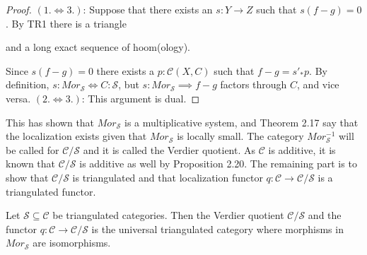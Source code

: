     \begin{proof}
        $(1.\iff 3.)$:
        Suppose that there exists an $s:Y\rightarrow Z$ such that $s(f-g)=0$. By TR1 there is a triangle  and a long exact sequence of hoom(ology).
        \begin{center}
        \end{center}
        Since $s(f-g)=0$ there exists a $p:\mathcal{C}(X,C)$ such that $f-g = s'_*p$. By definition, $s:Mor_\mathcal{S}\iff C:\mathcal{S}$, but $s:Mor_\mathcal{S}\implies f-g$ factors through $C$, and vice versa.
        $(2.\iff 3.)$:
        This argument is dual.
    \end{proof}

    This has shown that $Mor_\mathcal{S}$ is a multiplicative system, and Theorem 2.17 say that the localization exists given that $Mor_\mathcal{S}$ is locally small. The category $Mor_\mathcal{S}^{-1}$ will be called for $\mathcal{C}/\mathcal{S}$ and it is called the Verdier quotient. As $\mathcal{C}$ is additive, it is known that $\mathcal{C}/\mathcal{S}$ is additive as well by Proposition 2.20. The remaining part is to show that $\mathcal{C}/\mathcal{S}$ is triangulated and that localization functor $q:\mathcal{C}\rightarrow \mathcal{C}/\mathcal{S}$ is a triangulated functor.

    \begin{theorem}
        Let $\mathcal{S}\subseteq\mathcal{C}$ be triangulated categories. Then the Verdier quotient $\mathcal{C}/\mathcal{S}$ and the functor $q:\mathcal{C}\rightarrow\mathcal{C}/\mathcal{S}$ is the universal triangulated category where morphisms in $Mor_\mathcal{S}$ are isomorphisms.
    \end{theorem}

